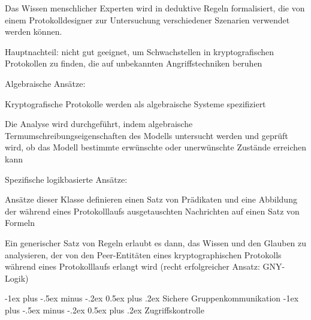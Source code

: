 \documentclass[a4paper]{article}
\makeatletter
\renewcommand{\section}{\@startsection{section}{1}{0mm}%
 {-1ex plus -.5ex minus -.2ex}%
 {0.5ex plus .2ex}%
 {\normalfont\large\bfseries}}
\makeatother
\begin{document}
\begin{multicols}{3}
\begin{itemize*}
\begin{itemize*}
                  \begin{itemize*}
                        \item Das Wissen menschlicher Experten wird in deduktive Regeln formalisiert, die von einem Protokolldesigner zur Untersuchung verschiedener Szenarien verwendet werden können.
                        \item Hauptnachteil: nicht gut geeignet, um Schwachstellen in kryptografischen Protokollen zu finden, die auf unbekannten Angriffstechniken beruhen
                  \end{itemize*}
                  \item Algebraische Ansätze:
                  \begin{itemize*}
                        \item Kryptografische Protokolle werden als algebraische Systeme spezifiziert
                        \item Die Analyse wird durchgeführt, indem algebraische Termumschreibungseigenschaften des Modells untersucht werden und geprüft wird, ob das Modell bestimmte erwünschte oder unerwünschte Zustände erreichen kann
                  \end{itemize*}
                  \item Spezifische logikbasierte Ansätze:
                  \begin{itemize*}
                        \item Ansätze dieser Klasse definieren einen Satz von Prädikaten und eine Abbildung der während eines Protokolllaufs ausgetauschten Nachrichten auf einen Satz von Formeln
                        \item Ein generischer Satz von Regeln erlaubt es dann, das Wissen und den Glauben zu analysieren, der von den Peer-Entitäten eines kryptographischen Protokolls während eines Protokolllaufs erlangt wird (recht erfolgreicher Ansatz: GNY-Logik)
                  \end{itemize*}
            \end{itemize*}
      \end{itemize*}

      \section{Sichere Gruppenkommunikation}
      \section{Zugriffskontrolle}

\end{multicols}
\end{document}
